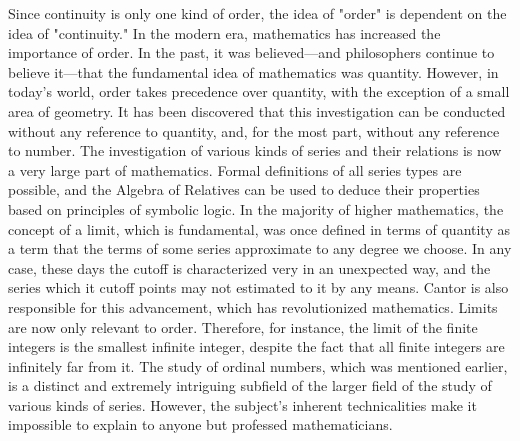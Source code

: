 \documentclass[a4paper,12pt]{book}[2004/02/16]
\theoremstyle{ilemma}
\theoremstyle{itheorem}
\theoremstyle{iother}
\theoremstyle{icorollary}
\theoremstyle{numcorollary}
\theoremstyle{idefinition}
\begin{document}
Since continuity is only one kind of order, the idea of "order" is dependent on the idea of "continuity." In the modern era, mathematics has increased the importance of order. In the past, it was believed—and philosophers continue to believe it—that the fundamental idea of mathematics was quantity. However, in today's world, order takes precedence over quantity, with the exception of a small area of geometry. It has been discovered that this investigation can be conducted without any reference to quantity, and, for the most part, without any reference to number. The investigation of various kinds of series and their relations is now a very large part of mathematics. Formal definitions of all series types are possible, and the Algebra of Relatives can be used to deduce their properties based on principles of symbolic logic. In the majority of higher mathematics, the concept of a limit, which is fundamental, was once defined in terms of quantity as a term that the terms of some series approximate to any degree we choose. In any case, these days the cutoff is characterized very
in an unexpected way, and the series which it cutoff points may not estimated to it
by any means. Cantor is also responsible for this advancement, which has revolutionized mathematics. Limits are now only relevant to order.
Therefore, for instance, the limit of the finite integers is the smallest infinite integer, despite the fact that all finite integers are infinitely far from it. The study of ordinal numbers, which was mentioned earlier, is a distinct and extremely intriguing subfield of the larger field of the study of various kinds of series. However, the subject's inherent technicalities make it impossible to explain to anyone but professed mathematicians.
\end{document}
